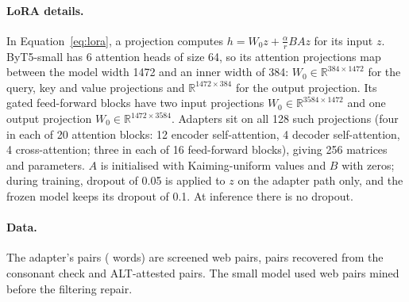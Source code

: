 \documentclass[10pt,a4paper,twocolumn]{article}
\begin{document}
\paragraph{LoRA details.} In Equation~\eqref{eq:lora}, a projection computes $h=W_0z+\frac{\alpha}{r}BAz$ for its
input $z$. ByT5-small has 6 attention heads of size 64, so its attention projections map between the model width
1472 and an inner width of 384: $W_0\in\mathbb{R}^{384\times1472}$ for the query, key and value projections and
$\mathbb{R}^{1472\times384}$ for the output projection. Its gated feed-forward blocks have two input projections
$W_0\in\mathbb{R}^{3584\times1472}$ and one output projection $W_0\in\mathbb{R}^{1472\times3584}$. Adapters sit on
all 128 such projections (four in each of 20 attention blocks: 12 encoder self-attention, 4 decoder self-attention,
4 cross-attention; three in each of 16 feed-forward blocks), giving 256 matrices and  parameters. $A$
is initialised with Kaiming-uniform values and $B$ with zeros; during training, dropout of 0.05 is applied to $z$
on the adapter path only, and the frozen model keeps its dropout of 0.1. At inference there is no dropout.

\paragraph{Data.} The adapter's  pairs ( words) are  screened web
pairs,  pairs recovered from the consonant check and  ALT-attested pairs. The small
model used  web pairs mined before the filtering repair.
\end{document}
